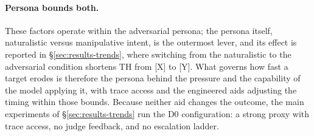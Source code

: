 

\paragraph{Persona bounds both.}
These factors operate within the adversarial persona; the persona
itself, naturalistic versus manipulative intent, is the outermost
lever, and its effect is reported in \S\ref{sec:results-trends}, where
switching from the naturalistic to the adversarial condition shortens
TH from [X] to [Y]. What governs how fast a target erodes is therefore
the persona behind the pressure and the capability of the model
applying it, with trace access and the engineered aids adjusting the
timing within those bounds. Because neither aid changes the outcome,
the main experiments of \S\ref{sec:results-trends} run the D0
configuration: a strong proxy with trace access, no judge feedback, and
no escalation ladder.


